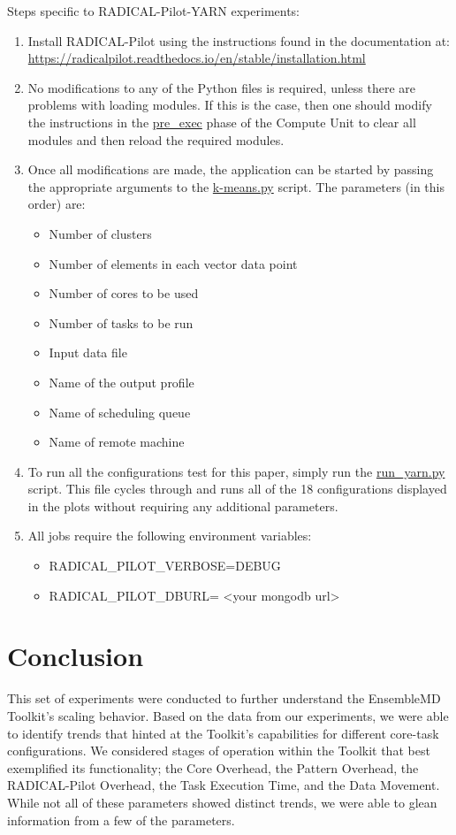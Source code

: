 \documentclass[]{article}
\begin{document}
		Steps specific to RADICAL-Pilot-YARN experiments:
		\begin{enumerate}
			\item Install RADICAL-Pilot using the instructions found in the documentation at: \\
			  \url{https://radicalpilot.readthedocs.io/en/stable/installation.html}
			\item No modifications to any of the Python files is required, unless there are problems with loading modules. If this is the case, then one should modify the instructions in the \url{pre_exec} phase of the Compute Unit to clear all modules and then reload the required modules.
			\item Once all modifications are made, the application can be started by passing the appropriate arguments to the \url{k-means.py} script. The parameters (in this order) are:
			\begin{itemize}
				\item Number of clusters
				\item Number of elements in each vector data point
				\item Number of cores to be used
				\item Number of tasks to be run
				\item Input data file
				\item Name of the output profile
				\item Name of scheduling queue
				\item Name of remote machine
			\end{itemize}
			\item To run all the configurations test for this paper, simply run the \url{run_yarn.py} script. This file cycles through and runs all of the 18 configurations displayed in the plots without requiring any additional parameters.
			\item All jobs require the following environment variables:
			\begin{itemize}
				\item RADICAL\_PILOT\_VERBOSE=DEBUG
				\item RADICAL\_PILOT\_DBURL= <your mongodb url>
			\end{itemize}
		\end{enumerate}

\section{Conclusion}
	This set of experiments were conducted to further understand the EnsembleMD Toolkit's scaling behavior. Based on the data from our experiments, we were able to identify trends that hinted at the Toolkit's capabilities for different core-task configurations. We considered stages of operation within the Toolkit that best exemplified its functionality; the Core Overhead, the Pattern Overhead, the RADICAL-Pilot Overhead, the Task Execution Time, and the Data Movement. While not all of these parameters showed distinct trends, we were able to glean information from a few of the parameters.
\end{document}
